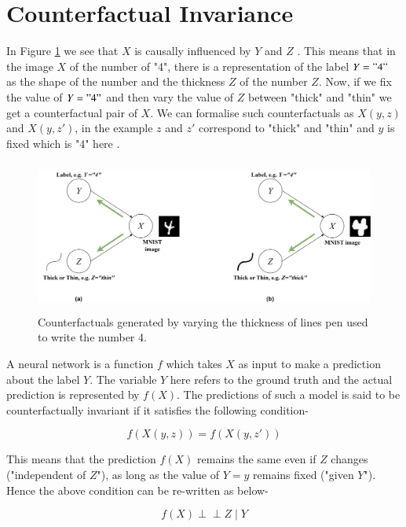 \documentclass[12pt,DIV14,BCOR12mm,a4paper,footinclude=false,headinclude,parskip=half-,twoside,openright,cleardoublepage=empty,toc=index,bibliography=totoc,listof=totoc]{scrreprt}
\numberwithin{equation}{chapter}
\begin{document}
\section{Counterfactual Invariance}

In Figure \ref{fig:counterfactuals} we see that $X$ is causally influenced by $Y$ and $Z$ \cite{10162210}. This means that in the image $X$ of the number of "4", there is a representation of the label $Y="4"$ as the shape of the number and the thickness $Z$ of the number $Z$. Now, if we fix the value of $Y="4"$ and then vary the value of $Z$ between "thick" and "thin" we get a counterfactual pair of $X$. We can formalise such counterfactuals as $X(y,z)$ and $X(y,z')$, in the example $z$ and $z'$ correspond to "thick" and "thin" and $y$ is fixed which is "4" here \cite{DBLP:journals/corr/abs-2106-00545}.

\begin{figure}[htbp]
    \centering
    \includegraphics[height=5cm]{figures/counterfactuals.png} 
    \caption{Counterfactuals generated by varying the thickness of lines pen used to write the number 4.}
    \label{fig:counterfactuals}
\end{figure}

A neural network is a function $f$ which takes $X$ as input to make a prediction about the label $Y$. The variable $Y$ here refers to the ground truth and the actual prediction is represented by $f(X)$. The predictions of such a model is said to be counterfactually invariant if it satisfies the following condition-

\begin{equation} \label{eq:counterfactual_invariance_1}
    f(X(y,z)) = f(X(y,z'))
\end{equation}

This means that the prediction $f(X)$ remains the same even if $Z$ changes ("independent of $Z$"), as long as the value of $Y=y$ remains fixed ("given $Y$"). Hence the above condition can be re-written as below-

\begin{equation} \label{eq:counterfactual_invariance_2}
    f(X) \perp\!\!\!\perp Z \mid Y 
\end{equation}
\end{document}
